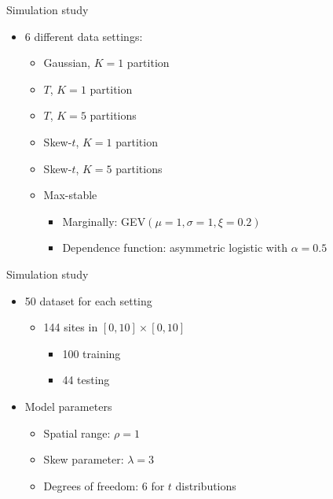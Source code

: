 \documentclass{beamer}
\begin{document}
\begin{frame}{Simulation study}
  \begin{itemize} \setlength{\itemsep}{0.5em}
    \item 6 different data settings:
    \begin{itemize}
      \item Gaussian, $K = 1$ partition
      \item $T$, $K = 1$ partition
      \item $T$, $K = 5$ partitions
      \item Skew-$t$, $K = 1$ partition
      \item Skew-$t$, $K = 5$ partitions
      \item Max-stable
      \begin{itemize}
        \item Marginally: GEV$(\mu=1, \sigma=1, \xi=0.2)$
        \item Dependence function: asymmetric logistic with $\alpha = 0.5$
      \end{itemize}
    \end{itemize}
  \end{itemize}
\end{frame}

\begin{frame}{Simulation study}
  \begin{itemize} \setlength{\itemsep}{0.5em}
    \item 50 dataset for each setting
    \begin{itemize}
      \item 144 sites in $[0, 10] \times [0, 10]$
      \begin{itemize}
        \item 100 training
        \item 44 testing
      \end{itemize}
    \end{itemize}
    \item Model parameters
    \begin{itemize}
      \item Spatial range: $\rho = 1$
      \item Skew parameter: $\lambda = 3$
      \item Degrees of freedom: 6 for $t$ distributions
    \end{itemize}
  \end{itemize}
\end{frame}
\end{document}
